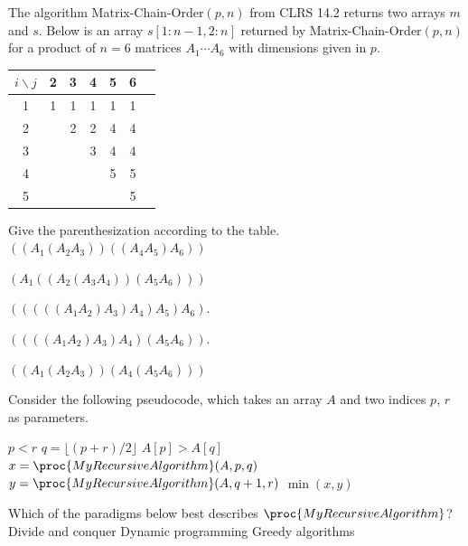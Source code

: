 \pageshift

The algorithm {\sc Matrix-Chain-Order}$(p,n)$ from CLRS 14.2 returns two arrays $m$ and $s$.
%
Below is an array $s[1:n-1, 2:n]$ returned by {\sc Matrix-Chain-Order}$(p,n)$ for a product of $n=6$ matrices $A_1\cdots A_6$ with dimensions given in $p$.
\medskip

\begin{tabular}{c|cccccc}
$i \backslash j$ & 2 & 3 & 4 & 5 & 6 \\
\hline
1 & 1 & 1 & 1 & 1 & 1 \\
2 & & 2 & 2 & 4 & 4 \\
3 &     & & 3 & 4 & 4 \\
4 &     &     & & 5 & 5 \\
5 &     &     &     & & 5 \\
\end{tabular}

\medskip\noindent
Give the parenthesization according to the table.
\oneanswer
%
\optionsstart
\answer $((A_1(A_2 A_3))((A_4 A_5)A_6))$

\answer $(A_1((A_2(A_3A_4))(A_5 A_6)))$ \correct

\answer $(((((A_1 A_2)A_3)A_4)A_5)A_6)$.

\answer $((((A_1 A_2)A_3)A_4)(A_5A_6))$.

\answer $((A_1(A_2 A_3))(A_4(A_5 A_6)))$
\optionsend
{}

Consider the following pseudocode, which takes an array $A$ and two indices $p$, $r$ as parameters.
\begin{codebox}
  \li \If $p<r$ \Do
  \li $q = \lfloor (p+r)/2\rfloor$
  \li \If $A[p]>A[q]$ \Do
  \li {}
  \li \Else
  \li $x = \proc{MyRecursiveAlgorithm}(A, p, q)$
  \li $y = \proc{MyRecursiveAlgorithm}(A, q+1, r)$
  \li \Return $\min(x,y)$ \End
  \li \Else
  \li {}\End
\end{codebox}
Which of the paradigms below best describes $\proc{MyRecursiveAlgorithm}$?
\oneanswer
\optionsstart
\answer Divide and conquer \correct
\answer Dynamic programming
\answer Greedy algorithms
\optionsend
{}

